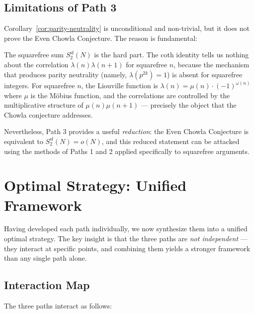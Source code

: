 \documentclass[11pt,a4paper]{article}
\theoremstyle{plain}
\theoremstyle{definition}
\begin{document}
\subsection{Limitations of Path 3}

Corollary~\ref{cor:parity-neutrality} is unconditional and non-trivial, but it does not prove the Even Chowla Conjecture. The reason is fundamental:

\begin{obstacle}
The squarefree sum $S_2^{\mathrm{sf}}(N)$ is the hard part. The coth identity tells us nothing about the correlation $\lambda(n)\lambda(n+1)$ for squarefree $n$, because the mechanism that produces parity neutrality (namely, $\lambda(p^{2k}) = 1$) is absent for squarefree integers. For squarefree $n$, the Liouville function is $\lambda(n) = \mu(n) \cdot (-1)^{\omega(n)}$ where $\mu$ is the M\"obius function, and the correlations are controlled by the multiplicative structure of $\mu(n)\mu(n+1)$ --- precisely the object that the Chowla conjecture addresses.
\end{obstacle}

Nevertheless, Path 3 provides a useful \emph{reduction}: the Even Chowla Conjecture is equivalent to $S_2^{\mathrm{sf}}(N) = o(N)$, and this reduced statement can be attacked using the methods of Paths 1 and 2 applied specifically to squarefree arguments.


\section{Optimal Strategy: Unified Framework}
\label{sec:optimal}

Having developed each path individually, we now synthesize them into a unified optimal strategy. The key insight is that the three paths are \emph{not independent} --- they interact at specific points, and combining them yields a stronger framework than any single path alone.

\subsection{Interaction Map}

The three paths interact as follows:
\end{document}
